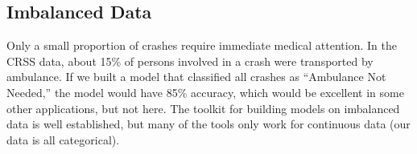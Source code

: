 \subsection{Imbalanced Data}

Only a small proportion of crashes require immediate medical attention.  In the CRSS data, about 15\% of persons involved in a crash were transported by ambulance.  If we built a model that classified all crashes as ``Ambulance Not Needed,'' the model would have 85\% accuracy, which would be excellent in some other applications, but not here.  The toolkit for building models on imbalanced data is well established, but many of the tools only work for continuous data (our data is all categorical).
	 
